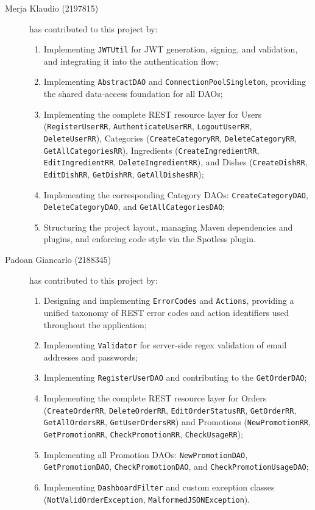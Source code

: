 \begin{description}
	\item[Merja Klaudio (2197815)] has contributed to this project by:
    \begin{enumerate}
        \item Implementing \texttt{JWTUtil} for JWT generation, signing, and validation, and integrating it into the authentication flow;
        \item Implementing \texttt{AbstractDAO} and \texttt{ConnectionPoolSingleton}, providing the shared data-access foundation for all DAOs;
        \item Implementing the complete REST resource layer for Users (\texttt{RegisterUserRR}, \texttt{AuthenticateUserRR}, \texttt{LogoutUserRR}, \texttt{DeleteUserRR}), Categories (\texttt{CreateCategoryRR}, \texttt{DeleteCategoryRR}, \texttt{GetAllCategoriesRR}), Ingredients (\texttt{CreateIngredientRR}, \texttt{EditIngredientRR}, \texttt{DeleteIngredientRR}), and Dishes (\texttt{CreateDishRR}, \texttt{EditDishRR}, \texttt{GetDishRR}, \texttt{GetAllDishesRR});
        \item Implementing the corresponding Category DAOs: \texttt{CreateCategoryDAO}, \texttt{DeleteCategoryDAO}, and \texttt{GetAllCategoriesDAO};
        \item Structuring the project layout, managing Maven dependencies and plugins, and enforcing code style via the Spotless plugin.
    \end{enumerate}

	\item[Padoan Giancarlo (2188345)] has contributed to this project by:
    \begin{enumerate}
        \item Designing and implementing \texttt{ErrorCodes} and \texttt{Actions}, providing a unified taxonomy of REST error codes and action identifiers used throughout the application;
        \item Implementing \texttt{Validator} for server-side regex validation of email addresses and passwords;
        \item Implementing \texttt{RegisterUserDAO} and contributing to the \texttt{GetOrderDAO};
        \item Implementing the complete REST resource layer for Orders (\texttt{CreateOrderRR}, \texttt{DeleteOrderRR}, \texttt{EditOrderStatusRR}, \texttt{GetOrderRR}, \texttt{GetAllOrdersRR}, \texttt{GetUserOrdersRR}) and Promotions (\texttt{NewPromotionRR}, \texttt{GetPromotionRR}, \texttt{CheckPromotionRR}, \texttt{CheckUsageRR});
        \item Implementing all Promotion DAOs: \texttt{NewPromotionDAO}, \texttt{GetPromotionDAO}, \texttt{CheckPromotionDAO}, and \texttt{CheckPromotionUsageDAO};
        \item Implementing \texttt{DashboardFilter} and custom exception classes (\texttt{NotValidOrderException}, \texttt{MalformedJSONException}).
    \end{enumerate}


\end{description}
